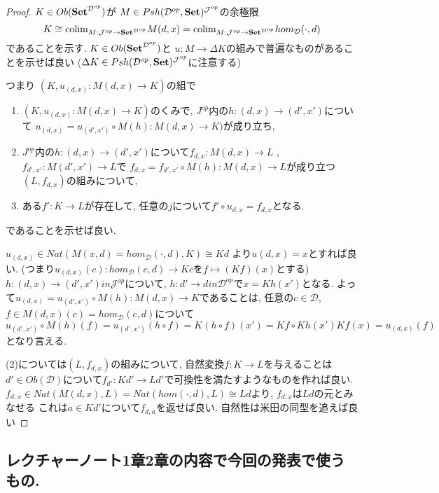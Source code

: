 \documentclass[dvipdfmx,a4paper,11pt]{article}
\newcommand{\colim}{{\rm colim}}
\theoremstyle{definition}
\begin{document}
\begin{proof}
$K \in Ob({\bf Set}^{\mathcal{D}^{op}})$が
$M \in Psh(\mathcal{D}^{op},{\bf Set})^{\mathcal{J}^{op}}$の余極限
$$
K \cong  \colim_{M : \mathcal{J}^{op} \to {\bf Set }^{\mathcal{D}^{op}}}M(d,x)
=\colim_{M : \mathcal{J}^{op} \to {\bf Set }^{\mathcal{D}^{op}}} hom_{\mathcal{D}}(\cdot, d)
$$
であることを示す. 
$K \in Ob({\bf Set}^{\mathcal{D}^{op}})$と $u: M \to \Delta K$の組みで普遍なものがあることを示せば良い
($\Delta K \in Psh(\mathcal{D}^{op},{\bf Set})^{\mathcal{J}^{op}}$に注意する)

つまり
$(K, u_{(d,x)}: M(d,x) \to K)$の組で
\begin{enumerate}
\item $(K, u_{(d,x)}: M(d,x) \to K)$のくみで, $J ^{op}$内の$h : (d,x)\to (d',x')$について
$u_{(d,x)}  = u_{(d',x')} \circ M(h) : M(d ,x) \to K)$が成り立ち, 
\item $J ^{op}$内の$h : (d,x)\to (d',x')$について$f_{d,x} : M(d,x) \to L$
, $f_{d',x'} : M(d',x') \to L$で
$f_{d,x}  = f_{d',x'}\circ M(h) : M(d,x) \to L$が成り立つ$(L, f_{d,x})$の組みについて,
\item ある$f' : K \to L$が存在して, 任意の$j$について$f' \circ u_{d,x} = f_{d,x}$となる.
\end{enumerate}
であることを示せば良い.

$u_{(d,x)} \in Nat(M(x, d)=hom_{\mathcal{D}}(\cdot, d), K) \cong Kd$
より$u{(d,x)} = x$とすれば良い. 
(つまり$u_{(d,x)}(c) : hom_{\mathcal{D}}(c, d) \to  Kc$を$f \mapsto (Kf)(x)$とする)
$h : (d,x)  \to (d',x') in \mathcal{J}^{op} $について, 
$h : d'  \to d in \mathcal{D}^{op}$で$x = Kh(x')$となる. 
よって$u_{(d,x)}  = u_{(d',x')} \circ M(h) : M(d ,x) \to K$であることは, 
任意の$c \in \mathcal{D}$, $f \in M(d ,x)(c) = hom_{\mathcal{D}}(c, d) $について
$$
u_{(d',x')} \circ M(h) (f)
= u_{(d',x')} (h \circ f) 
=K(h \circ f) (x')
=Kf\circ Kh (x')
Kf (x)=u_{(d,x)}(f) 
$$
となり言える. 

(2)については$(L, f_{d,x})$の組みについて, 
自然変換$f : K \to L$を与えることは$d' \in Ob(\mathcal{D})$について$f_{d'} : Kd' \to Ld'$で可換性を満たすようなものを作れば良い. $f_{d,x} \in Nat( M(d,x), L)=Nat( hom(\cdot,d), L)\cong Ld$より, $f_{d,x}$は$Ld$の元とみなせる
これは$a \in Kd'$について$f_{d,a}$を返せば良い. 
自然性は米田の同型を追えば良い
\end{proof}

\subsection{レクチャーノート1章2章の内容で今回の発表で使うもの.}
\end{document}

